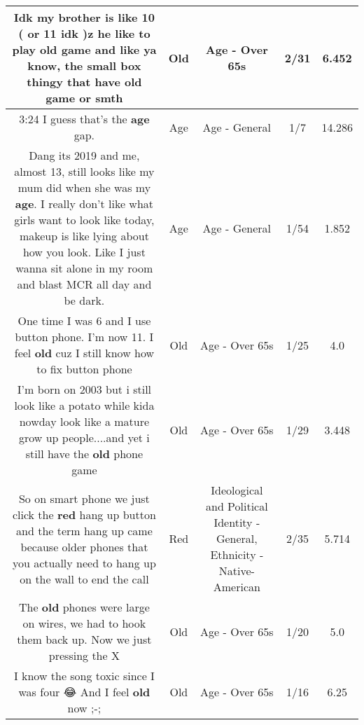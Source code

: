 \documentclass[11pt]{article}
\newlength\mylength
\begin{document}
\begin{center}
\begin{longtable}{|C{.65\mylength}|C{.30\mylength}|C{.12\mylength}|C{.12\mylength}|C{.12\mylength}|}
  \small Idk my brother is like 10 ( or 11 idk )z he like to play \textbf{old} game and like ya know, the small box thingy that have \textbf{old} game or smth\normalsize   & Old & Age - Over 65s & 2/31 & 6.452 \\  \hline
  \small 3:24 I guess that's the \textbf{age} gap.\normalsize   & Age & Age - General & 1/7 & 14.286 \\  \hline
  \small Dang its 2019 and me, almost 13, still looks like my mum did when she was my \textbf{age}. I really don't like what girls want to look like today, makeup is like lying about how you look. Like I just wanna sit alone in my room and blast MCR all day and be dark.\normalsize   & Age & Age - General & 1/54 & 1.852 \\  \hline
  \small One time I was 6 and I use button phone. I'm now 11. I feel \textbf{old} cuz I still know how to fix button phone\normalsize   & Old & Age - Over 65s & 1/25 & 4.0 \\  \hline
  \small I'm born on 2003 but i still look like a potato while kida nowday look like a mature grow up people....and yet i still have the \textbf{old} phone game\normalsize   & Old & Age - Over 65s & 1/29 & 3.448 \\  \hline
  \small So on smart phone we just click the \textbf{r\textbf{ed}} hang up button and the term hang up came because older phones that you actually need to hang up on the wall to end the call\normalsize   & Red &  Ideological and Political Identity - General, Ethnicity - Native-American & 2/35 & 5.714 \\  \hline
  \small The \textbf{old} phones were large on wires, we had to hook them back up. Now we just pressing the X\normalsize   & Old & Age - Over 65s & 1/20 & 5.0 \\  \hline
  \small I know the song toxic since I was four 😂 And I feel \textbf{old} now ;-;\normalsize   & Old & Age - Over 65s & 1/16 & 6.25 \\  \hline

\end{longtable}
\end{center}
\end{document}
